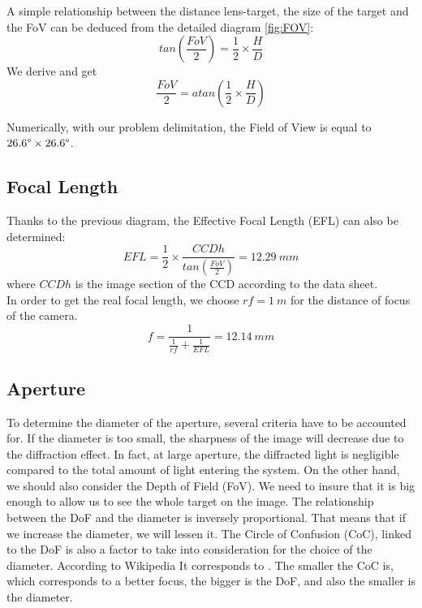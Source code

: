 A simple relationship between the distance lens-target, the size of the target and the FoV can be deduced from the detailed diagram \ref{fig:FOV}: 
\begin{equation*}
tan( \frac{FoV}{2}) = \frac{1}{2} \times \frac{H}{D}
\end{equation*}
We derive and get
\begin{equation*}
 \frac{FoV}{2} = atan(\frac{1}{2} \times \frac{H}{D})
\end{equation*}

Numerically, with our problem delimitation, the Field of View is equal to $26.6\degree \times 26.6\degree$. 

\subsection{Focal Length}
\label{focalLength}
Thanks to the previous diagram, the Effective Focal Length (EFL) can also be determined: 
\begin{equation*}
EFL = \frac{1}{2} \times \frac{CCDh}{tan(\frac{FoV}{2})} = 12.29 \ mm
\end{equation*}
where $CCDh$ is the image section of the CCD according to the data sheet.\\

In order to get the real focal length, we choose $rf = 1 \ m$ for the distance of focus of the camera. 
\begin{equation*}
f = \frac{1}{\frac{1}{rf}+\frac{1}{EFL}} = 12.14 \ mm
\end{equation*}

\subsection{Aperture}
\label{aperture}
To determine the diameter of the aperture, several criteria have to be accounted for. If the diameter is too small, the sharpness of the image will decrease due to the diffraction effect. In fact, at large aperture, the diffracted light is negligible compared to the total amount of light entering the system. On the other hand, we should also consider the Depth of Field (FoV). We need to insure that it is big enough to allow us to see the whole target on the image. The relationship between the DoF and the diameter is inversely proportional. That means that if we increase the diameter, we will lessen it. The Circle of Confusion (CoC), linked to the DoF is also a factor to take into consideration for the choice of the diameter. According to Wikipedia \cite{wiki:coc} It corresponds to . The smaller the CoC is, which corresponds to a better focus, the bigger is the DoF, and also the smaller is the diameter.

